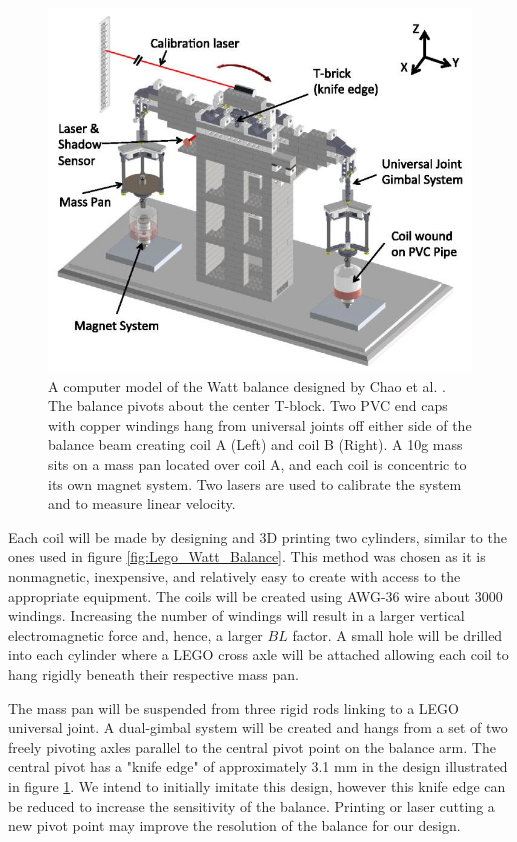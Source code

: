 \documentclass[aps,prstab,reprint,12pt]{revtex4-1}
\begin{document}
\begin{figure}[t]
    \centering\includegraphics[width=.95\linewidth]{figs/paper_diagram.jpg}
    \caption{A computer model of the Watt balance designed by Chao et al. \cite{Chao2015}. The balance pivots about the center T-block. Two PVC end caps with copper windings hang from universal joints off either side of the balance beam creating coil A (Left) and coil B (Right). A 10\si{g} mass sits on a mass pan located over coil A, and each coil is concentric to its own magnet system. Two lasers are used to calibrate the system and to measure linear velocity.}\label{fig:chao_balance}
\end{figure}

Each coil will be made by designing and 3D printing two cylinders, similar to the ones used in figure \ref{fig:Lego_Watt_Balance}. This method was chosen as it is nonmagnetic, inexpensive, and relatively easy to create with access to the appropriate equipment. The coils will be created using AWG-36 wire about 3000 windings. Increasing the number of windings will result in a larger vertical electromagnetic force and, hence, a larger $BL$ factor. A small hole will be drilled into each cylinder where a LEGO cross axle will be attached allowing each coil to hang rigidly beneath their respective mass pan. 

The mass pan will be suspended from three rigid rods linking to a LEGO universal joint. A dual-gimbal system will be created and hangs from a set of two freely pivoting axles parallel to the central pivot point on the balance arm. The central pivot has a "knife edge" of approximately 3.1 \si{mm} in the design illustrated in figure \ref{fig:chao_balance}. We intend to initially imitate this design, however this knife edge can be reduced to increase the sensitivity of the balance. Printing or laser cutting a new pivot point may improve the resolution of the balance for our design.
\end{document}
